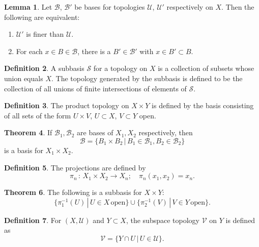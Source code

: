 \documentclass[twocolumn]{article}
\theoremstyle{definition}
\newtheorem{definition}{Definition}[section]
\newtheorem{theorem}[definition]{Theorem}
\newtheorem{lemma}[definition]{Lemma}
\begin{document}
\begin{lemma}
    Let $\mathcal{B}$, $\mathcal{B}'$ be bases for topologies $\mathcal{U}$, $\mathcal{U}'$ respectively on $X$. Then the following are equivalent:
    \begin{enumerate}[noitemsep]
            \item $\mathcal{U}'$ is finer than $\mathcal{U}$.
            \item For each $x \in B \in \mathcal{B}$, there is a $B' \in \mathcal{B'}$ with $x \in B' \subset B$.
    \end{enumerate}
\end{lemma}
\begin{definition}
    A subbasis $\mathcal{S}$ for a topology on $X$ is a collection of subsets whose union equals $X$.
    The topology generated by the subbasis is defined to be the collection of all unions of finite intersections of elements of $\mathcal{S}$.
\end{definition}
\begin{definition}
    The product topology on $X \times Y$ is defined by the basis consisting of all sets of the form $U \times V$, $U \subset X$, $V \subset Y$ open.
\end{definition}
\begin{theorem}
    If $\mathcal{B}_1, \mathcal{B}_2$ are bases of $X_1, X_2$ respectively, then
    \begin{equation}
        \mathcal{B} = \{B_1 \times B_2 \, | \, B_1 \in \mathcal{B}_1, B_2 \in \mathcal{B}_2\}
    \end{equation}
    is a basis for $X_1 \times X_2$.
\end{theorem}
\begin{definition}
    The projections are defined by
    \begin{equation}
        \pi_n \, : \, X_1 \times X_2 \rightarrow X_n; \quad \pi_n(x_1, x_2) = x_n.
    \end{equation}
\end{definition}
\begin{theorem}
    The following is a subbasis for $X \times Y$:
    \begin{equation}
        \{ \pi_1^{-1}(U) \, | \, U \in X \,\textrm{open} \}
        \cup \{ \pi_2^{-1}(V) \, | \, V \in Y \,\textrm{open} \}.
    \end{equation}
\end{theorem}
\begin{definition}
    For $(X, \mathcal{U})$ and $Y \subset X$, the subspace topology $\mathcal{V}$ on $Y$ is defined as
    \begin{equation}
        \mathcal{V} = \{ Y \cap U \, | \, U \in \mathcal{U} \}.
    \end{equation}
\end{definition}
\end{document}
